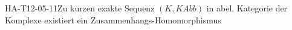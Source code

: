 
\begin{THEO}{HA-T12-05-11}{Zu kurzen exakte Sequenz $(K,KAbb)$ in abel. Kategorie der Komplexe existiert ein Zusammenhangs-Homomorphismus}
\end{THEO}
